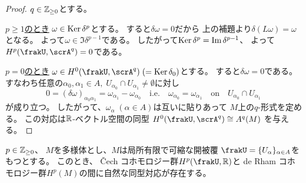 \documentclass[report]{jlreq}
\begin{document}
\begin{proof}
    $q \in \mathbb{Z}_{\ge 0}$とする。

    \uline{$p \ge 1$のとき} \quad
    $\omega \in \operatorname{\mathrm{Ker}} \delta^p$とする。
    すると$\delta \omega = 0$だから
    上の補題より$\delta(L\omega) = \omega$となる。
    よって$\omega \in \Im \delta^{p - 1}$である。
    したがって$\operatorname{\mathrm{Ker}} \delta^p = \operatorname{\mathrm{Im}} \delta^{p - 1}$、
    よって$H^p(\frakU, \scrA^q) = 0$である。

    \uline{$p = 0$のとき} \quad
    $\omega \in H^0(\frakU, \scrA^q) \; (= \Ker \delta_0)$とする。
    すると$\delta \omega = 0$である。
    すなわち任意の$\alpha_0, \alpha_1 \in A, \;
    U_{\alpha_0} \cap U_{\alpha_1} \ne \emptyset$に対し
    \begin{equation}
        0 = (\delta \omega)_{\alpha_0 \alpha_1}
            = \omega_{\alpha_1} - \omega_{\alpha_0}
            \quad \text{i.e.} \quad
            \omega_{\alpha_0} = \omega_{\alpha_1}
            \quad \text{on} \quad
            U_{\alpha_0} \cap U_{\alpha_1}
    \end{equation}
    が成り立つ。
    したがって、$\omega_\alpha \; (\alpha \in A)$は互いに貼りあって
    $M$上の$q$-形式を定める。
    この対応は$\mathbb{R}$-ベクトル空間の同型
    $H^0(\frakU, \scrA^q) \cong A^q(M)$
    を与える。
\end{proof}

\begin{theorem}
    $p \in \mathbb{Z}_{\ge 0}$、
    $M$を多様体とし、$M$は局所有限で可縮な開被覆
    $\frakU = \{ U_\alpha \}_{\alpha \in A}$をもつとする。
    このとき、
    \v{C}ech コホモロジー群$H^p(\frakU, \R)$と
    de Rham コホモロジー群$H^p(M)$の間に自然な\footnotemark{}同型対応が存在する。
\end{theorem}

\end{document}
